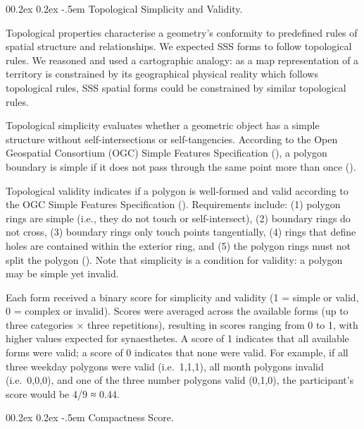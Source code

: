\documentclass[
  man,
  floatsintext,
  longtable,
  nolmodern,
  notxfonts,
  notimes,
  colorlinks=true,linkcolor=blue,citecolor=blue,urlcolor=blue]{apa7}
\makeatletter
\renewcommand{\paragraph}{\@startsection{paragraph}{4}{\parindent}%
	{0\baselineskip \@plus 0.2ex \@minus 0.2ex}%
	{-.5em}%
	{\normalfont\normalsize\bfseries\typesectitle}}
\newcounter{none} %
\makeatother
\begin{document}
\paragraph{Topological Simplicity and
Validity.}\label{topological-simplicity-and-validity}

Topological properties characterise a geometry's conformity to
predefined rules of spatial structure and relationships. We expected SSS
forms to follow topological rules. We reasoned and used a cartographic
analogy: as a map representation of a territory is constrained by its
geographical physical reality which follows topological rules, SSS
spatial forms could be constrained by similar topological rules.

Topological simplicity evaluates whether a geometric object has a simple
structure without self-intersections or self-tangencies. According to
the Open Geospatial Consortium (OGC) Simple Features Specification
(), a polygon boundary is
simple if it does not pass through the same point more than once
().

Topological validity indicates if a polygon is well-formed and valid
according to the OGC Simple Features Specification
(). Requirements include: (1)
polygon rings are simple (i.e., they do not touch or self-intersect),
(2) boundary rings do not cross, (3) boundary rings only touch points
tangentially, (4) rings that define holes are contained within the
exterior ring, and (5) the polygon rings must not split the polygon
(). Note that simplicity is a
condition for validity: a polygon may be simple yet invalid.

Each form received a binary score for simplicity and validity (1 =
simple or valid, 0 = complex or invalid). Scores were averaged across
the available forms (up to three categories × three repetitions),
resulting in scores ranging from 0 to 1, with higher values expected for
synaesthetes. A score of 1 indicates that all available forms were
valid; a score of 0 indicates that none were valid. For example, if all
three weekday polygons were valid (i.e.~1,1,1), all month polygons
invalid (i.e.~0,0,0), and one of the three number polygons valid
(0,1,0), the participant's score would be 4/9 ≈ 0.44.

\paragraph{Compactness Score.}\label{compactness-score}
\end{document}
